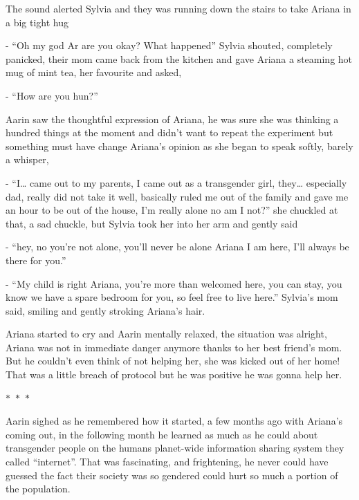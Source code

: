 \documentclass[hidelinks,12pt,a4paper]{book}
\newcommand\sep{\begin{center}
  $\ast$~$\ast$~$\ast$
\end{center}}
\begin{document}
The sound alerted Sylvia and they was running down the stairs to take Ariana in a big tight hug\newline

- “Oh my god Ar are you okay? What happened” Sylvia shouted, completely panicked, 
their mom came back from the kitchen and gave Ariana a steaming hot mug of mint tea, her favourite and asked,\newline

- “How are you hun?”\par
\bigskip

Aarin saw the thoughtful expression of Ariana, he was sure she was thinking a hundred 
things at the moment and didn't want to repeat the experiment but something must have change 
Ariana's opinion as she began to speak softly, barely a whisper, \par
\bigskip

- “I… came out to my parents, I came out as a transgender girl, they… especially dad, 
really did not take it well, basically ruled me out of the family and gave me an hour to be out 
of the house, I'm really alone no am I not?” she chuckled at that, a sad chuckle, 
but Sylvia took her into her arm and gently said\par
\bigskip
- “hey, no you're not alone, you'll never be alone Ariana I am here, I'll always be there for you.”\par
\bigskip
- “My child is right Ariana, you're more than welcomed here, you can stay,
 you know we have a spare bedroom for you, so feel free to live here.” Sylvia's mom said,
  smiling and gently stroking Ariana's hair.\par
  \bigskip

Ariana started to cry and Aarin mentally relaxed, the situation was alright, 
Ariana was not in immediate danger anymore thanks to her best friend's mom.
 But he couldn't even think of not helping her, she was kicked out of her home! That was a little breach of protocol 
 but he was positive he was gonna help her.

 \sep

Aarin sighed as he remembered how it started, a few months ago with Ariana's coming out, in the following month he 
learned as much as he could about transgender people on the humans planet-wide information sharing system 
they called “internet”. That was fascinating, and frightening, he never could have guessed the fact their 
society was so gendered could hurt so much a portion of the population.\par
\bigskip
\end{document}
